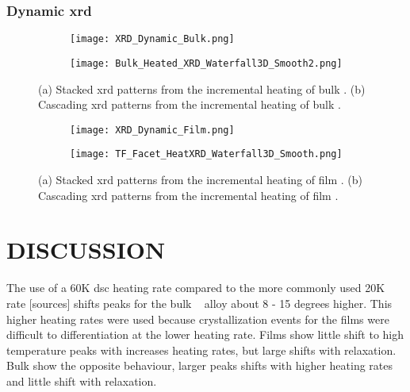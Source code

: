 \documentclass[draft,a4paper,12pt,oneside]{article}%
\begin{document}
\subsubsection{Dynamic \acrshort{xrd}}

\begin{figure}[b]
	\centering
	\begin{subfigure}[htbp]{0.75\textwidth}
		\texttt{[image: XRD\_Dynamic\_Bulk.png]}
		\caption{}
		\label{fig:XRD_Dynamic_FullStack_Bulk}
	\end{subfigure}
	\begin{subfigure}[htbp]{0.75\textwidth}
		\texttt{[image: Bulk\_Heated\_XRD\_Waterfall3D\_Smooth2.png]}
		\caption{}
		\label{fig:XRD_Dynamic_WaterFall_Bulk}
	\end{subfigure}
	\caption{(a) Stacked \gls{xrd} patterns from the incremental heating of bulk \MgZnCa. (b) Cascading \gls{xrd} patterns from the incremental heating of bulk \MgZnCa. }%
	\label{fig:XRD_Dynamic_Bulk}
\end{figure}

\begin{figure}[b]
	\centering
	\begin{subfigure}[htbp]{0.75\textwidth}
		\texttt{[image: XRD\_Dynamic\_Film.png]}
		\caption{}
		\label{fig:XRD_Dynamic_FullStack_Film}
	\end{subfigure}
	\begin{subfigure}[htbp]{0.75\textwidth}
		\texttt{[image: TF\_Facet\_HeatXRD\_Waterfall3D\_Smooth.png]}
		\caption{}
		\label{fig:XRD_Dynamic_WaterFall_Film}
	\end{subfigure}
	\caption{(a) Stacked \gls{xrd} patterns from the incremental heating of film \MgZnCa. (b) Cascading \gls{xrd} patterns from the incremental heating of film \MgZnCa. }%
	\label{fig:XRD_Dynamic_Film}
\end{figure}


\section{DISCUSSION}

The use of a 60K \gls{dsc} heating rate compared to the more commonly used 20K rate [sources] shifts peaks for the bulk \MgZnCa~ alloy about 8 - 15 degrees higher. This higher heating rates were used because crystallization events for the films were difficult to differentiation at the lower heating rate. 
Films show little shift to high temperature peaks with increases heating rates, but large shifts with relaxation. 
Bulk show the opposite behaviour, larger peaks shifts with higher heating rates and little shift with relaxation.
\end{document}
